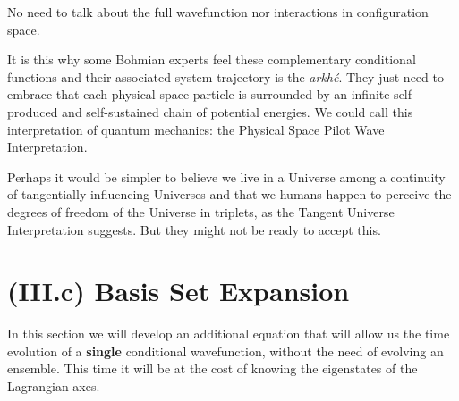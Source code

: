 \documentclass[11pt, a4paper]{article} %
\begin{document}
No need to talk about the full wavefunction nor interactions in configuration space.

It is this why some Bohmian experts feel these complementary conditional functions and  their associated system trajectory is the {\em arkhé}. They just need to embrace that each physical space particle is surrounded by an infinite self-produced and self-sustained chain of potential energies. We could call this interpretation of quantum mechanics: the Physical Space Pilot Wave Interpretation.

Perhaps it would be simpler to believe we live in a Universe among a continuity of tangentially influencing Universes and that we humans happen to perceive the degrees of freedom of the Universe in triplets, as the Tangent Universe Interpretation suggests. But they might not be ready to accept this.
\vspace{-0.25cm}

\section*{(III.c) Basis Set Expansion\vspace{-0.2cm}}
In this section we will develop an additional equation that will allow us the time evolution of a {\bf single} conditional wavefunction, without the need of evolving an ensemble. This time it will be at the cost of knowing the eigenstates of the Lagrangian axes.
\end{document}
